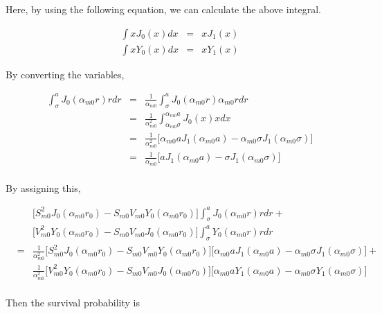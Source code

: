 \documentclass{article}
\begin{document}
Here, by using the following equation, we can calculate the above integral.

\begin{eqnarray}
    \int xJ_0(x) dx &=& xJ_1(x)\\
    \int xY_0(x) dx &=& xY_1(x)
\end{eqnarray}

By converting the variables,

\begin{eqnarray}
    \int_\sigma^a J_0(\alpha_{m0}r) rdr
    &=& \frac{1}{\alpha_{m0}}  \int_\sigma^a J_0(\alpha_{m0}r) \alpha_{m0}r dr \\
    &=& \frac{1}{\alpha_{m0}^2}\int_{\alpha_{m0}\sigma}^{\alpha_{m0}a} J_0(x) x dx \\
    &=& \frac{1}{\alpha_{m0}^2}\Big[\alpha_{m0}a J_1(\alpha_{m0}a) - \alpha_{m0}\sigma J_1(\alpha_{m0}\sigma) \Big] \\
    &=& \frac{1}{\alpha_{m0}}  \Big[aJ_1(\alpha_{m0}a) - \sigma J_1(\alpha_{m0}\sigma) \Big] \\
\end{eqnarray}

By assigning this,

\begin{eqnarray}
    & & \Big[S_{m0}^2 J_0(\alpha_{m0} r_0) - S_{m0}V_{m0} Y_0(\alpha_{m0} r_0) \Big] \int_\sigma^a J_0(\alpha_{m0} r) rdr + \nonumber\\
    & & \Big[V_{m0}^2 Y_0(\alpha_{m0} r_0) - S_{m0}V_{m0} J_0(\alpha_{m0} r_0) \Big] \int_\sigma^a Y_0(\alpha_{m0} r) rdr   \nonumber\\
    &=& \frac{1}{\alpha_{m0}^2}\Big[S_{m0}^2 J_0(\alpha_{m0} r_0) - S_{m0}V_{m0} Y_0(\alpha_{m0} r_0) \Big]\Big[\alpha_{m0}a J_1(\alpha_{m0}a) - \alpha_{m0}\sigma J_1(\alpha_{m0}\sigma) \Big] + \nonumber\\
    & & \frac{1}{\alpha_{m0}^2}\Big[V_{m0}^2 Y_0(\alpha_{m0} r_0) - S_{m0}V_{m0} J_0(\alpha_{m0} r_0) \Big]\Big[\alpha_{m0}a Y_1(\alpha_{m0}a) - \alpha_{m0}\sigma Y_1(\alpha_{m0}\sigma) \Big]   \nonumber\\
\end{eqnarray}

Then the survival probability is
\end{document}
